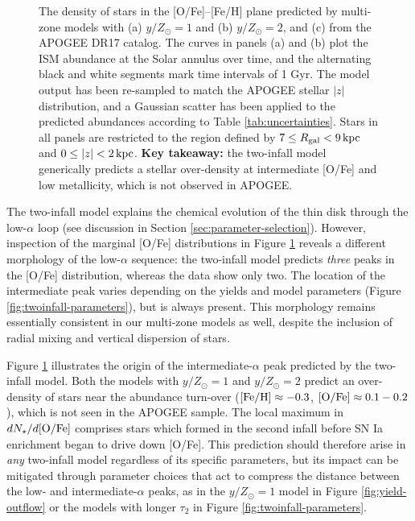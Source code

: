 \documentclass[twocolumn,twocolappendix,linenumbers]{aastex631}
\newcommand{\mathFeH}{{\rm [Fe/H]}}
\newcommand{\mathOFe}{{\rm [O/Fe]}}
\newcommand{\kpc}{\,{\rm kpc}}
\begin{document}
\begin{figure}
    \caption{The density of stars in the [O/Fe]--[Fe/H] plane predicted by multi-zone models with (a) $y/Z_\odot=1$ and (b) $y/Z_\odot=2$, and (c) from the APOGEE DR17 catalog. The curves in panels (a) and (b) plot the ISM abundance at the Solar annulus over time, and the alternating black and white segments mark time intervals of {1 Gyr}. The model output has been re-sampled to match the APOGEE stellar $|z|$ distribution, and a Gaussian scatter has been applied to the predicted abundances according to Table \ref{tab:uncertainties}. Stars in all panels are restricted to the region defined by $7\leq R_{\rm gal}< 9\kpc$ and $0\leq|z|<2\kpc$. {\bf Key takeaway:} the two-infall model generically predicts a stellar over-density at intermediate [O/Fe] and low metallicity, which is not observed in APOGEE.}
    \label{fig:ofe-feh-density}
\end{figure}

The two-infall model explains the chemical evolution of the thin disk through the low-$\alpha$ loop (see discussion in Section \ref{sec:parameter-selection}). However, inspection of the marginal [O/Fe] distributions in Figure \ref{fig:ofe-feh-density} reveals a different morphology of the low-$\alpha$ sequence: the two-infall model predicts {\it three} peaks in the [O/Fe] distribution, whereas the data show only two. The location of the intermediate peak varies depending on the yields and model parameters (Figure \ref{fig:twoinfall-parameters}), but is always present. This morphology remains essentially consistent in our multi-zone models as well, despite the inclusion of radial mixing and vertical dispersion of stars.

Figure \ref{fig:ofe-feh-density} illustrates the origin of the intermediate-$\alpha$ peak predicted by the two-infall model. Both the models with $y/Z_\odot=1$ and $y/Z_\odot=2$ predict an over-density of stars near the abundance turn-over ($\mathFeH\approx-0.3$, $\mathOFe\approx0.1-0.2$), which is not seen in the APOGEE sample. The local maximum in $dN_\star/d\mathOFe$ comprises stars which formed in the second infall before SN Ia enrichment began to drive down [O/Fe]. This prediction should therefore arise in {\it any} two-infall model regardless of its specific parameters, but its impact can be mitigated through parameter choices that act to compress the distance between the low- and intermediate-$\alpha$ peaks, as in the $y/Z_\odot=1$ model in Figure \ref{fig:yield-outflow} or the models with longer $\tau_2$ in Figure \ref{fig:twoinfall-parameters}.
\end{document}
